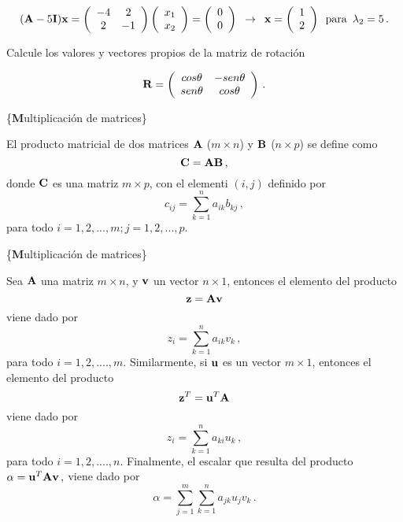 \documentclass[
]{agujournal2019}
\begin{document}
\[({\textbf A}-5{\textbf I}){\textbf x}=
\left(\begin{array}{ccccc}
  -4 & 2\\
  2 & -1\\
      \end{array}\right)
      \left(\begin{array}{c}
  x_1 \\
  x_2 \\
      \end{array}\right)=
      \left(\begin{array}{c}
  0 \\
  0 \\
      \end{array}\right)\,\,\,\rightarrow\,\,\,{\textbf x}=\left(\begin{array}{c}
  1 \\
  2 \\
      \end{array}\right)\,\,\,{\rm para}\,\,\,\lambda_2=5\,.\]

\vspace{0.25cm}

 Calcule los valores y vectores propios de
la matriz de rotación

\[{\textbf R}=
\left(\begin{array}{ccccc}
  cos\theta & -sen\theta\\
  sen\theta & cos\theta\\
      \end{array}\right)\,.\]

\vspace{0.5cm}

\{\noindent \textbf Multiplicación de matrices\}

\noindent El producto matricial de dos matrices \({\textbf A}\)
(\(m\times n\)) y \({\textbf B}\) (\(n\times p\)) se define como
\[{\textbf C}={\textbf A}{\textbf B}\,,\] donde \({\textbf C}\) es una
matriz \(m\times p\), con el elementi \((i,j)\) definido por
\[c_{ij}=\sum^n_{k=1} a_{ik} b_{kj}\,,\] para todo
\(i=1,2,...,m; j=1,2,...,p\).

\vspace{0.5cm}

\{\noindent \textbf Multiplicación de matrices\}

\noindent Sea \({\textbf A}\) una matriz \(m\times n\), y
\({\textbf v}\) un vector \(n\times 1\), entonces el elemento del
producto \[{\textbf z}={\textbf A}{\textbf v}\] viene dado por
\[z_{i}=\sum^n_{k=1} a_{ik} v_{k}\,,\] para todo \(i=1,2,....,m\).
Similarmente, si \({\textbf u}\) es un vector \(m\times 1\), entonces el
elemento del producto \[{\textbf z}^T={\textbf u}^T{\textbf A}\] viene
dado por \[z_{i}=\sum^n_{k=1} a_{ki} u_{k}\,,\] para todo
\(i=1,2,....,n\). Finalmente, el escalar que resulta del producto
\(\alpha={\textbf u}^T{\textbf A}{\textbf v}\,,\) viene dado por
\[\alpha=\sum^m_{j=1}\sum^n_{k=1}a_{jk} u_j v_k\,.\]
\end{document}
